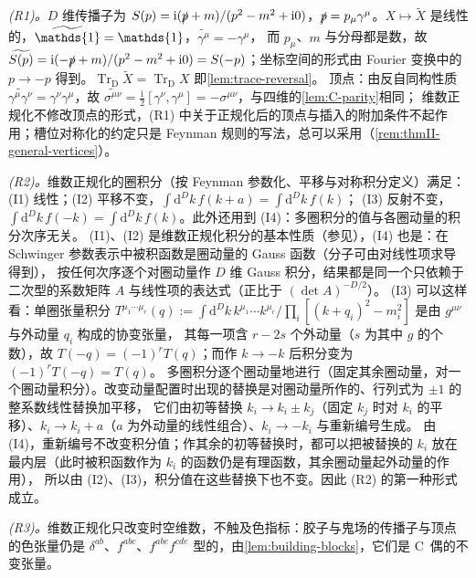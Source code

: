 \documentclass[UTF8,a4paper,11pt,fontset=fandol]{ctexart}
\makeatletter
\let\amsmathbb\mathbb
\renewcommand{\mathbb}[1]{\ifx1#1\mathds{1}\else\amsmathbb{#1}\fi}
\theoremstyle{cplain}
\theoremstyle{cdefinition}
\theoremstyle{cremark}
\renewcommand{\proofname}{证明}
\renewenvironment{proof}[1][\proofname]{\par\pushQED{\qed}\normalfont\topsep6\p@\@plus6\p@\relax
  \trivlist\item[\hskip\labelsep\itshape #1\hspace{0.5em}]\ignorespaces}{\popQED\endtrivlist\@endpefalse}
\numberwithin{equation}{section}
\newcommand{\TrD}{\operatorname{Tr}_{\mathrm{D}}}   %
\newcommand{\sla}[1]{\slashed{#1}}                  %
\newcommand{\dd}{\mathrm{d}}                         %
\newcommand{\ii}{\mathrm{i}}                        %
\newcommand{\Cconj}[1]{\widetilde{#1}}              %
\makeatother
\begin{document}
\begin{proof}
\emph{(R1)。}$D$ 维传播子为 $S(p)=\ii(\sla p+m)/(p^2-m^2+\ii0)$，$\sla p=p_\mu\gamma^\mu$。$X\mapsto\Cconj X$ 是线性的，$\Cconj{\mathbb 1}=\mathbb 1$，$\Cconj{\gamma^\mu}=-\gamma^\mu$，
而 $p_\mu$、$m$ 与分母都是数，故 $\Cconj{S(p)}=\ii(-\sla p+m)/(p^2-m^2+\ii0)=S(-p)$；坐标空间的形式由 Fourier 变换中的 $p\to-p$ 得到。$\TrD\Cconj X=\TrD X$ 即\cref{lem:trace-reversal}。
顶点：由反自同构性质 $\Cconj{\gamma^\mu\gamma^\nu}=\gamma^\nu\gamma^\mu$，故 $\Cconj{\sigma^{\mu\nu}}=\frac{\ii}{2}[\gamma^\nu,\gamma^\mu]=-\sigma^{\mu\nu}$，与四维的\cref{lem:C-parity}相同；
维数正规化不修改顶点的形式，(R1) 中关于正规化后的顶点与插入的附加条件不起作用；槽位对称化的约定只是 Feynman 规则的写法，总可以采用（\cref{rem:thmII-general-vertices}）。

\emph{(R2)。}维数正规化的圈积分（按 Feynman 参数化、平移与对称积分定义）满足：(I1) 线性；(I2) 平移不变，$\int\dd^Dk\,f(k+a)=\int\dd^Dk\,f(k)$；
(I3) 反射不变，$\int\dd^Dk\,f(-k)=\int\dd^Dk\,f(k)$。此外还用到 (I4)：多圈积分的值与各圈动量的积分次序无关。
(I1)、(I2) 是维数正规化积分的基本性质（参见\cite{tHooftVeltman1972}），(I4) 也是：在 Schwinger 参数表示中被积函数是圈动量的 Gauss 函数（分子可由对线性项求导得到），
按任何次序逐个对圈动量作 $D$ 维 Gauss 积分，结果都是同一个只依赖于二次型的系数矩阵 $A$ 与线性项的表达式（正比于 $(\det A)^{-D/2}$）。
(I3) 可以这样看：单圈张量积分 $T^{\mu_1\cdots\mu_r}(q):=\int\dd^Dk\,k^{\mu_1}\cdots k^{\mu_r}/\prod_i[(k+q_i)^2-m_i^2]$ 是由 $g^{\mu\nu}$ 与外动量 $q_i$ 构成的协变张量，
其每一项含 $r-2s$ 个外动量（$s$ 为其中 $g$ 的个数），故 $T(-q)=(-1)^rT(q)$；而作 $k\to-k$ 后积分变为 $(-1)^rT(-q)=T(q)$。
多圈积分逐个圈动量地进行（固定其余圈动量，对一个圈动量积分）。改变动量配置时出现的替换是对圈动量所作的、行列式为 $\pm1$ 的整系数线性替换加平移，
它们由初等替换 $k_i\to k_i\pm k_j$（固定 $k_j$ 时对 $k_i$ 的平移）、$k_i\to k_i+a$（$a$ 为外动量的线性组合）、$k_i\to-k_i$ 与重新编号生成。
由 (I4)，重新编号不改变积分值；作其余的初等替换时，都可以把被替换的 $k_i$ 放在最内层（此时被积函数作为 $k_i$ 的函数仍是有理函数，其余圈动量起外动量的作用），
所以由 (I2)、(I3)，积分值在这些替换下也不变。因此 (R2) 的第一种形式成立。

\emph{(R3)。}维数正规化只改变时空维数，不触及色指标：胶子与鬼场的传播子与顶点的色张量仍是 $\delta^{ab}$、$f^{abc}$、$f^{abe}f^{cde}$ 型的，由\cref{lem:building-blocks}，它们是 C~偶的不变张量。


\end{proof}
\end{document}
